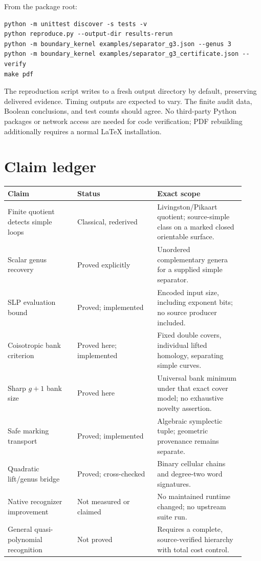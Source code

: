 \documentclass[11pt,letterpaper]{article}
\theoremstyle{definition}
\theoremstyle{remark}
\begin{document}
From the package root:
\begin{verbatim}
python -m unittest discover -s tests -v
python reproduce.py --output-dir results-rerun
python -m boundary_kernel examples/separator_g3.json --genus 3
python -m boundary_kernel examples/separator_g3_certificate.json --verify
make pdf
\end{verbatim}
The reproduction script writes to a fresh output directory by default, preserving delivered evidence. Timing outputs are expected to vary. The finite audit data, Boolean conclusions, and test counts should agree. No third-party Python packages or network access are needed for code verification; PDF rebuilding additionally requires a normal LaTeX installation.

\section{Claim ledger}
\begin{longtable}{@{}>{\raggedright\arraybackslash}p{0.27\linewidth}>{\raggedright\arraybackslash}p{0.31\linewidth}>{\raggedright\arraybackslash}p{0.34\linewidth}@{}}
\toprule
Claim & Status & Exact scope\\
\midrule
\endhead
Finite quotient detects simple loops & Classical, rederived & Livingston/Pikaart quotient; source-simple class on a marked closed orientable surface.\\[4pt]
Scalar genus recovery & Proved explicitly & Unordered complementary genera for a supplied simple separator.\\[4pt]
SLP evaluation bound & Proved; implemented & Encoded input size, including exponent bits; no source producer included.\\[4pt]
Coisotropic bank criterion & Proved here; implemented & Fixed double covers, individual lifted homology, separating simple curves.\\[4pt]
Sharp $g+1$ bank size & Proved here & Universal bank minimum under that exact cover model; no exhaustive novelty assertion.\\[4pt]
Safe marking transport & Proved; implemented & Algebraic symplectic tuple; geometric provenance remains separate.\\[4pt]
Quadratic lift/genus bridge & Proved; cross-checked & Binary cellular chains and degree-two word signatures.\\[4pt]
Native recognizer improvement & Not measured or claimed & No maintained runtime changed; no upstream suite run.\\[4pt]
General quasi-polynomial recognition & Not proved & Requires a complete, source-verified hierarchy with total cost control.\\
\bottomrule
\end{longtable}
\end{document}
